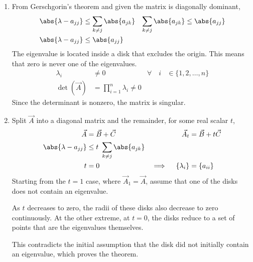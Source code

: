 \begin{enumerate}
    \item From Gerschgorin's theorem and given the matrix is diagonally dominant,
          \begin{align}
              \abs{\lambda - a_{jj}}       & \leq \sum_{k \neq j} \abs{a_{jk}} &
              \sum_{k \neq j} \abs{a_{jk}} & \leq \abs{a_{jj}}                   \\
              \abs{\lambda - a_{jj}}       & \leq \abs{a_{jj}}
          \end{align}
          The eigenvalue is located inside a disk that excludes the origin. This means
          that zero is never one of the eigenvalues.
          \begin{align}
              \lambda_i       & \neq 0                             &
              \forall \quad i & \in \{1,2,\dots,n\}                  \\
              \det(\vec{A})   & = \prod_{i=1}^{n} \lambda_i \neq 0
          \end{align}
          Since the determinant is nonzero, the matrix is singular.

    \item Split $ \vec{A} $ into a diagonal matrix and the remainder, for some real
          scalar $ t $,
          \begin{align}
              \vec{A}                      & = \vec{B} + \vec{C}                   &
              \vec{A}_t                    & = \vec{B} + t\vec{C}                    \\
              \abs{\lambda - a_{jj}}       & \leq t\  \sum_{k \neq j} \abs{a_{jk}}   \\
              t                            & = 0                                   &
              \implies \quad \{\lambda_i\} & = \{a_{ii}\}
          \end{align}
          Starting from the $ t = 1 $ case, where $ \vec{A}_1 = \vec{A} $, assume that
          one of the disks does not contain an eigenvalue. \par
          As $ t $ decreases to zero, the radii of these disks also decrease to zero
          continuously. At the other extreme, at $ t = 0 $, the disks reduce to a
          set of points that are the eigenvalues themselves. \par
          This contradicts the initial assumption that the disk did not initially contain
          an eigenvalue, which proves the theorem.
\end{enumerate}